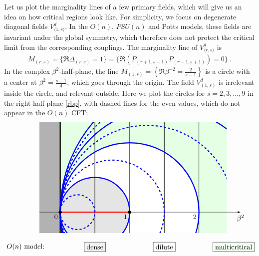 \documentclass[12pt, a4paper]{article}
\begin{document}
Let us plot the marginality lines of a few primary fields, which will give us an idea on how critical regions look like. For simplicity, we focus on degenerate diagonal fields $V^d_{\langle 1,s\rangle}$. In the $O(n)$, $PSU(n)$ and Potts models, these fields are invariant under the global symmetry, which therefore does not protect the critical limit from the corresponding couplings. The marginality line of $V^d_{\langle r,s\rangle}$ is
\begin{align}
 M_{(r,s)} = \Big\{\Re\Delta_{(r,s)} = 1 \Big\} = \Big\{\Re \left(P_{(r+1,s-1)}P_{(r-1,s+1)}\right) = 0\Big\} \ . 
\end{align}
In the complex $\beta^2$-half-plane, the line $M_{(1,s)}=\left\{\Re\beta^{-2}=\frac{2}{s-1}\right\}$ is a circle with a center at $\beta^2=\frac{s-1}{4}$, which goes through the origin. The field $V^d_{(1,s)}$ is irrelevant inside the circle, and relevant outside. Here we plot the circles for $s=2,3,\dots, 9$ in the right half-plane \eqref{rbp}, with dashed lines for the even values, which do not appear in the $O(n)$ CFT:
\begin{align}
 \begin{tikzpicture}[baseline=(current  bounding  box.center), scale = 3.5]
 \draw [-latex] (-.3, 0) -- (2.6, 0) node[below]{$\beta^2$};
 \node at (-.5, -.5) {$O(n)$ model:};
 \node[draw, fill = black!5] at (.5, -.5) {dense};
 \node[draw] at (1.5, -.5) {dilute};
 \node[draw, fill = green!5] at (2.5, -.5) {multicritical};
 \clip (-.3, -.3) -- (-.3, 1.3) -- (2.4, 1.3) -- (2.4, -.3) -- cycle;
 \fill [color = green!10] (0, -1.3) -- (2.4, -1.3) -- (2.4, 1.3) -- (0, 1.3) -- cycle;
  \fill [color = white] (1, 0) circle [radius = 1];
 \fill [color = black!10] (.5, 0) circle [radius = .5];
 \fill [color = black!30] (0, -1.3) -- (-.3, -1.3) -- (-.3, 1.3) -- (0, 1.3) -- cycle;
 \draw[ultra thick] (0, -1.3) -- (0, 1.3);
 \draw[thick] (.5, -1.3) -- (.5, 1.3);
 \draw[thick] (1, -1.3) -- (1, 1.3);
 \draw[thick] (1.5, -1.3) -- (1.5, 1.3);
 \draw[thick] (2, -1.3) -- (2, 1.3);
 \draw[ultra thick, green!70!black] (1, -1) -- (1,1.5);
  \draw [-latex] (-.3, 0) -- (0, 0) node [below left] {$0$} -- (1, 0) node [below left] {$1$} -- (2, 0) node[below left] {$2$} -- (2.6, 0);
   \draw [ultra thick, red] (0, 0) -- (1, 0); 
  \foreach \s in {2,4,6,8}{
  \draw [ultra thick, dashed, blue] ({(\s-1)/4}, 0) circle [radius = (\s-1)/4];
  \draw [ultra thick, blue] ({\s/4}, 0) circle [radius = \s/4];
  }
 \node at (1, 0) [fill, circle, scale = .5] {};
 \node at (0, 0) [fill, circle, scale = .5] {};
 \end{tikzpicture} 
 \label{phases}
\end{align}
\end{document}
